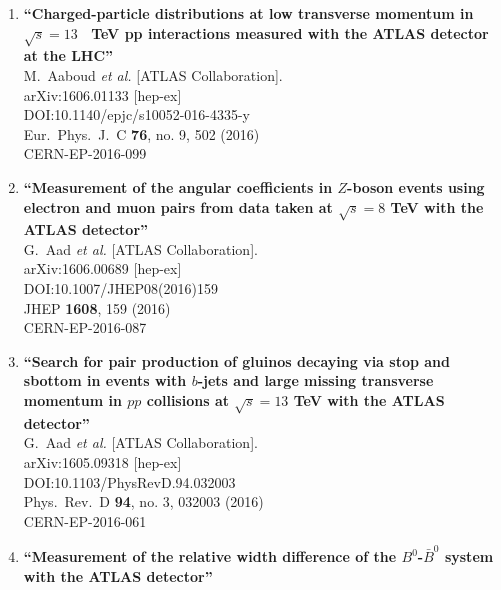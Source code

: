 \documentclass{article}
\begin{document}
\begin{enumerate}
\item%
{\bf ``Charged-particle distributions at low transverse momentum in $\sqrt{s} = 13$  TeV pp interactions measured with the ATLAS detector at the LHC''}
  \\{}M.~Aaboud {\it et al.} [ATLAS Collaboration].
  \\{}arXiv:1606.01133 [hep-ex]
  \\{}DOI:10.1140/epjc/s10052-016-4335-y
  \\{}Eur.\ Phys.\ J.\ C {\bf 76}, no. 9, 502 (2016)
  \\{}CERN-EP-2016-099
\item%
{\bf ``Measurement of the angular coefficients in $Z$-boson events using electron and muon pairs from data taken at $\sqrt{s}=8$ TeV with the ATLAS detector''}
  \\{}G.~Aad {\it et al.} [ATLAS Collaboration].
  \\{}arXiv:1606.00689 [hep-ex]
  \\{}DOI:10.1007/JHEP08(2016)159
  \\{}JHEP {\bf 1608}, 159 (2016)
  \\{}CERN-EP-2016-087
\item%
{\bf ``Search for pair production of gluinos decaying via stop and sbottom in events with $b$-jets and large missing transverse momentum in $pp$ collisions at $\sqrt{s} = 13$ TeV with the ATLAS detector''}
  \\{}G.~Aad {\it et al.} [ATLAS Collaboration].
  \\{}arXiv:1605.09318 [hep-ex]
  \\{}DOI:10.1103/PhysRevD.94.032003
  \\{}Phys.\ Rev.\ D {\bf 94}, no. 3, 032003 (2016)
  \\{}CERN-EP-2016-061
\item%
{\bf ``Measurement of the relative width difference of the $B^0$-$\bar B^0$ system with the ATLAS detector''}

\end{enumerate}
\end{document}
